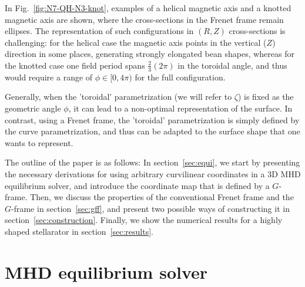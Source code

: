 \documentclass[12pt]{iopart}
\newcommand\hlchangedrev[1]{#1} %
\newcommand\GFF{$G$-frame}
\begin{document}
In Fig.~\ref{fig:N7-QH-N3-knot}, examples of a helical magnetic axis and a knotted magnetic axis are shown, where the cross-sections in the Frenet frame remain ellipses. The representation of such configurations in $(R,Z)$ cross-sections is challenging: for the helical case the magnetic axis points in the vertical ($Z$) direction in some places, generating strongly elongated bean shapes, whereas for the knotted case one field period spans $\frac{2}{3}(2\pi)$ in the toroidal angle, and thus would require a range of $\phi \in[0,4\pi)$ for the full configuration. 

Generally, when the 'toroidal' parametrization (we will refer to $\zeta$) is fixed as the geometric angle  $\phi$, it can lead to a non-optimal representation of the surface. 
In contrast, using a Frenet frame, the 'toroidal' parametrization is simply defined by the curve parametrization, and thus can be adapted to the surface shape that one wants to represent.

The outline of the paper is as follows:  \hlchangedrev{In section~\ref{sec:equi}, we start by presenting the necessary derivations for using arbitrary curvilinear coordinates in a 3D MHD equilibrium solver, and introduce the coordinate map that is defined by a \GFF{}. 
Then, we discuss the properties of the conventional Frenet frame and the \GFF{} in section~\ref{sec:gff}, and present two possible ways of constructing it in section~\ref{sec:construction}. 
Finally, we show the numerical results 
for a highly shaped stellarator in section~\ref{sec:results}.}



\section{\hlchangedrev{MHD equilibrium solver} \label{sec:equi}}
\end{document}
